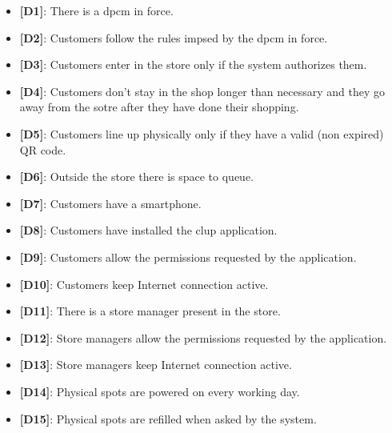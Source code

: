 \begin{itemize}

	\item \textbf{{[D1]}}: There is a \gls{dpcm} in force.
	\item \textbf{{[D2]}}: Customers follow the rules impsed by the \gls{dpcm} in force.
	\item \textbf{{[D3]}}: Customers enter in the store only if the system authorizes them.
	\item \textbf{{[D4]}}: Customers don't stay in the shop longer than necessary and they go away from the sotre after they have done their shopping.
	\item \textbf{{[D5]}}: Customers line up physically only if they have a valid (non expired) QR code.
	\item \textbf{{[D6]}}: Outside the store there is space to queue.
	\item \textbf{{[D7]}}: Customers have a smartphone.
	\item \textbf{{[D8]}}: Customers have installed the \gls{clup} application.
	\item \textbf{{[D9]}}: Customers allow the permissions requested by the application.
	\item \textbf{{[D10]}}: Customers keep Internet connection active.
	\item \textbf{{[D11]}}: There is a store manager present in the store.
	\item \textbf{{[D12]}}: Store managers allow the permissions requested by the application.
	\item \textbf{{[D13]}}: Store managers keep Internet connection active.
	\item \textbf{{[D14]}}: Physical spots are powered on every working day.
	\item \textbf{{[D15]}}: Physical spots are refilled when asked by the system.

\end{itemize}